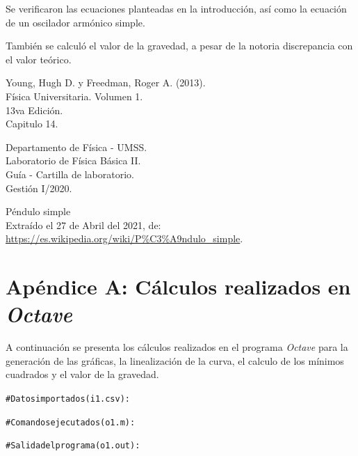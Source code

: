 \documentclass[letter,11pt]{article}
\begin{document}
Se verificaron las ecuaciones planteadas en la introducción, así como la
ecuación de un oscilador armónico simple.

También se calculó el valor de la gravedad, a pesar de la notoria discrepancia
con el valor teórico.

\begin{thebibliography}{99}

 Young, Hugh D. y Freedman, Roger A. (2013).\\
Física Universitaria. Volumen 1.\\
13va Edición.\\
Capitulo 14.

 Departamento de Física - UMSS.\\
Laboratorio de Física Básica II.\\
Guía - Cartilla de laboratorio.\\
Gestión I/2020.

 Péndulo simple \\
Extraído el 27 de Abril del 2021, de: \\
\url{https://es.wikipedia.org/wiki/P%C3%A9ndulo_simple}.

\end{thebibliography}

\newpage
\section*{Apéndice A: Cálculos realizados en \emph{Octave}}

A continuación se presenta los cálculos realizados en el programa \emph{Octave}
para la generación de las gráficas, la linealización de la curva, el calculo
de los mínimos cuadrados y el valor de la gravedad.

\begin{shaded}
\begin{alltt}
\footnotesize
\# Datos importados (i1.csv):

\normalsize
\end{alltt}
\end{shaded}

\begin{shaded}
\begin{alltt}
\footnotesize
\# Comandos ejecutados (o1.m):



\normalsize
\end{alltt}
\end{shaded}

\begin{shaded}
\begin{alltt}
\footnotesize
\# Salida del programa (o1.out):

\normalsize
\end{alltt}
\end{shaded}
\end{document}
